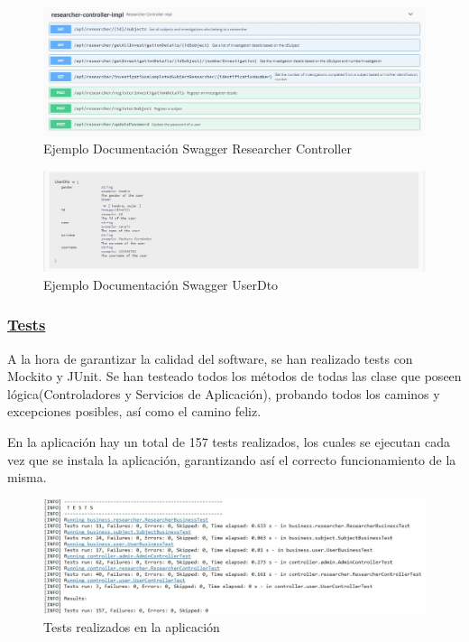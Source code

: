           \begin{figure}[h]
            \centering
            \includegraphics[width=1\textwidth]{images/swaggerendpoint.JPG}
            \caption{Ejemplo Documentación Swagger Researcher Controller}
        \end{figure}
        
        \begin{figure}[h]
            \centering
            \includegraphics[width=1\textwidth]{images/swaggeruserdto.JPG}
            \caption{Ejemplo Documentación Swagger UserDto}
        \end{figure}
        
        \FloatBarrier
        
        
        \subsubsection{\underline{Tests}}
        A la hora de garantizar la calidad del software, se han realizado tests con Mockito y JUnit. Se han testeado todos los métodos de todas las clase que poseen lógica(Controladores y Servicios de Aplicación), probando todos los caminos y excepciones posibles, así como el camino feliz.
        \newline
        
        En la aplicación hay un total de 157 tests realizados, los cuales se ejecutan cada vez que se instala la aplicación, garantizando así el correcto funcionamiento de la misma.
        \newline
        
          \begin{figure}[h]
            \centering
            \includegraphics[width=1\textwidth]{images/numtests.JPG}
            \caption{Tests realizados en la aplicación}
        \end{figure}
        
